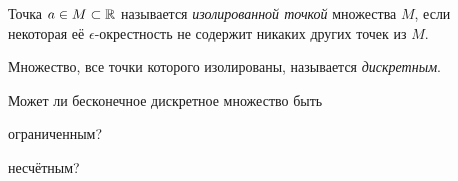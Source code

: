 \documentclass[a4paper, 12pt, num=28]{listok}
\begin{document}
\begin{definition}
	Точка $a \in M \subset \mathbb{R}$ называется \textit{изолированной точкой} множества $M$,
	если некоторая её $\epsilon$-окрестность не содержит никаких других точек из $M$.
\end{definition}
\begin{definition}
	Множество, все точки которого изолированы, называется \textit{дискретным}.
\end{definition}
\begin{problem}
	Может ли бесконечное дискретное множество быть
	\begin{probparts}
		\item ограниченным?
		\item несчётным?
	\end{probparts}
\end{problem}
\end{document}
